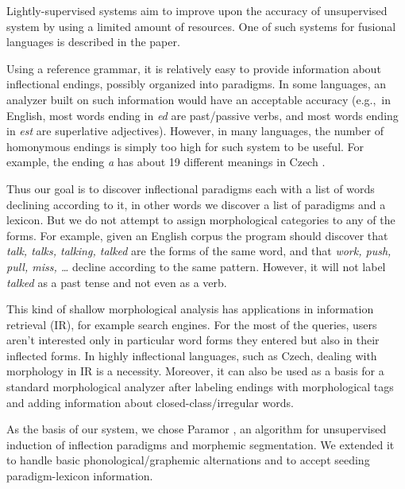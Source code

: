 \documentclass[11pt]{article}
\newcommand{\e}[1]{\textit{#1}} %
\newcommand{\eg}{e.g.,~}
\begin{document}
Lightly-supervised systems aim to improve upon the accuracy of unsupervised system by using a limited amount of resources. One of such systems for fusional languages is described in the paper.

Using a reference grammar, it is relatively easy to provide information about inflectional endings, possibly organized into paradigms. In some languages, an analyzer built on such information would have an acceptable accuracy (\eg in English, most words ending in \e{ed} are past/passive verbs, and most words ending in \e{est} are superlative adjectives). However, in many languages, the number of homonymous endings is simply too high for such system to be useful. For example, the ending \e{a} has about 19 different meanings in Czech \cite{feldman-hana-2010-rodopi}.

Thus our goal is to discover inflectional paradigms each with a list of words declining according to it, in other words we discover a list of paradigms and a lexicon. But we do not attempt to assign morphological categories to any of the forms. For example, given an English corpus the program should discover that \e{talk, talks, talking, talked} are the forms of the same word, and that \e{work, push, pull, miss, \ldots} decline according to the same pattern. However, it will not label \e{talked} as a past tense and not even as a verb.

This kind of shallow morphological analysis has applications in information retrieval (IR), for example search engines. For the most of the queries, users aren't interested only in particular word forms they entered but also in their inflected forms. In highly inflectional languages, such as Czech, dealing with morphology in IR is a necessity. Moreover, it can also be used as a basis for a standard morphological analyzer after labeling endings with morphological tags and adding information about closed-class/irregular words.

As the basis of our system, we chose Paramor \cite{monson09}, an algorithm for unsupervised induction of inflection paradigms and morphemic segmentation. We extended it to handle basic phonological/graphemic alternations and to accept seeding paradigm-lexicon information.


\end{document}
